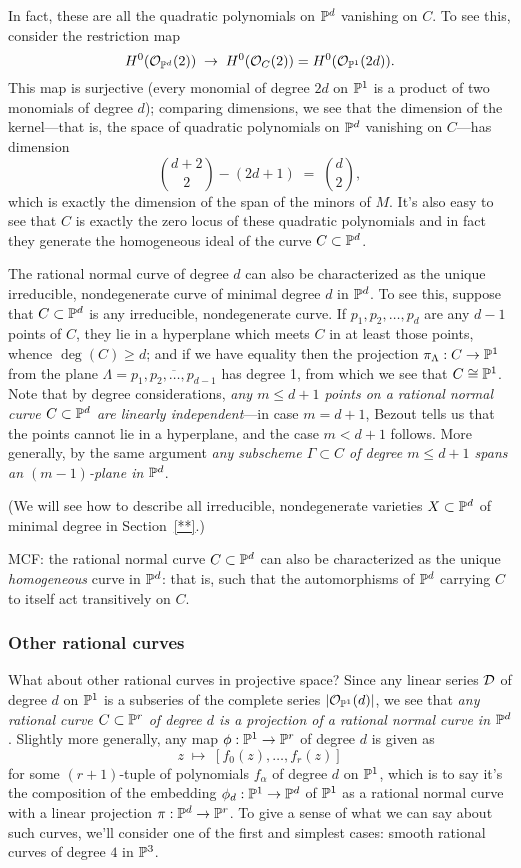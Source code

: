 In fact, these are all the quadratic polynomials on $\PP^d$ vanishing on $C$. To see this, consider the restriction map
$$
H^0(\cO_{\PP^d}(2)) \; \to \; H^0(\cO_{C}(2)) = H^0(\cO_{\PP^1}(2d)).
$$
This map is surjective (every monomial of degree $2d$ on $\PP^1$ is a product of two monomials of degree $d$); comparing dimensions, we see that the dimension of the kernel---that is, the space of quadratic polynomials on $\PP^d$ vanishing on $C$---has dimension
$$
\binom{d+2}{2} - (2d+1) \; = \; \binom{d}{2},
$$
which is exactly the dimension of the span of the minors of $M$. It's also easy to see that $C$ is exactly the zero locus of these quadratic polynomials  and in fact they generate the homogeneous ideal of the curve $C \subset \PP^d$.

The rational normal curve of degree $d$ can also be characterized as the unique irreducible, nondegenerate curve of minimal degree $d$ in $\PP^d$. To see this, suppose that $C \subset \PP^d$ is any irreducible, nondegenerate curve. If $p_1,p_2,\dots,p_{d}$ are any $d-1$ points of $C$, they lie in a hyperplane which meets $C$ in at least those points, whence $\deg(C) \geq d$; and if we have equality then the projection $\pi_\Lambda : C \to \PP^1$ from the plane $\Lambda = \overline{p_1,p_2,\dots,p_{d-1}}$ has degree 1, from which we see that $C \cong \PP^1$.  Note that by degree considerations, \emph{any $m \leq d+1$ points on a rational normal curve $C \subset \PP^d$ are linearly independent}---in case $m=d+1$, Bezout tells us that the points cannot lie in a hyperplane, and the case $m < d+1$ follows. More generally, by the same argument \emph{any subscheme $\Gamma \subset C$ of degree $m \leq d+1$ spans an $(m-1)$-plane in $\PP^d$}.

(We will see how to describe all irreducible, nondegenerate varieties $X \subset \PP^d$ of minimal degree in Section~\ref{**}.)

MCF: the rational normal curve $C \subset \PP^d$ can also be characterized as the unique \emph{homogeneous} curve in $\PP^d$: that is, such that the automorphisms of $\PP^d$ carrying $C$ to itself act transitively on $C$.

\subsubsection{Other rational curves}

What about other rational curves in projective space? Since any linear series $\cD$ of degree $d$ on $\PP^1$ is a subseries of the complete series $|\cO_{\PP^1}(d)|$, we see that \emph{any rational curve $C \subset \PP^r$ of degree $d$ is a projection of a rational normal curve in $\PP^d$}. Slightly more generally, any map $\phi : \PP^1 \to \PP^r$ of degree $d$ is given as
$$
z \; \mapsto \; [f_0(z), \dots, f_r(z)]
$$
for some $(r+1)$-tuple of polynomials $f_\alpha$ of degree $d$ on $\PP^1$, which is to say it's the composition of the embedding $\phi_d : \PP^1 \to \PP^d$ of $\PP^1$ as a rational normal curve with a linear projection $\pi : \PP^d \to \PP^r$. To give a sense of what we can say about such curves, we'll consider one of the first and simplest cases: smooth rational curves of degree $4$ in $\PP^3$.

